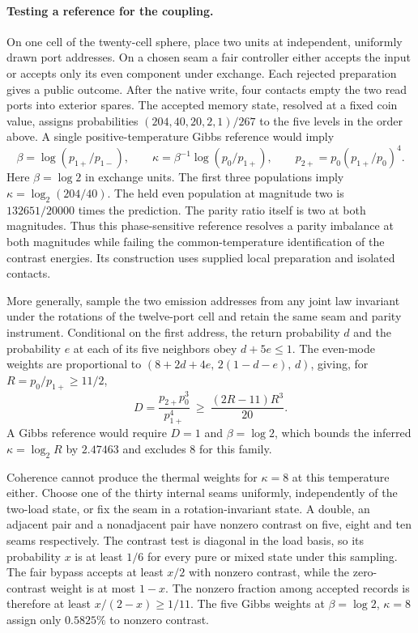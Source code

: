 \documentclass[11pt]{article}
\theoremstyle{definition}
\theoremstyle{remark}
\theoremstyle{plain}
\begin{document}
\paragraph{Testing a reference for the coupling.}
On one cell of the twenty-cell sphere, place two units at independent,
uniformly drawn port addresses. On a chosen seam a fair controller either
accepts the input or accepts only its even component under exchange.
Each rejected preparation gives a public outcome. After the native write,
four contacts empty the two read ports into exterior spares. The accepted
memory state, resolved at a fixed coin value, assigns probabilities
$(204,40,20,2,1)/267$ to the five levels in the order above. A single
positive-temperature Gibbs reference would imply
\[
  \beta=\log(p_{1+}/p_{1-}),\qquad
  \kappa=\beta^{-1}\log(p_0/p_{1+}),\qquad
  p_{2+}=p_0(p_{1+}/p_0)^4 .
\]
Here $\beta=\log 2$ in exchange units. The first three populations imply
$\kappa=\log_2(204/40)$. The held even population at magnitude two is
$132651/20000$ times the prediction. The parity ratio itself is two at
both magnitudes. Thus this phase-sensitive reference resolves a parity
imbalance at both magnitudes while failing the common-temperature
identification of the contrast energies. Its construction uses supplied
local preparation and isolated contacts.

More generally, sample the two emission addresses from any joint law invariant
under the rotations of the twelve-port cell and retain the same seam and parity
instrument. Conditional on the first address, the return probability $d$ and
the probability $e$ at each of its five neighbors obey $d+5e\leq1$.
The even-mode weights are proportional to
$(8+2d+4e,\,2(1-d-e),\,d)$, giving, for $R=p_0/p_{1+}\geq11/2$,
\[
 D=\frac{p_{2+}p_0^3}{p_{1+}^4}\ \geq\ \frac{(2R-11)R^3}{20}.
\]
A Gibbs reference would require $D=1$ and $\beta=\log 2$, which bounds
the inferred $\kappa=\log_2 R$ by $2.47463$ and excludes $8$ for this family.

Coherence cannot produce the thermal weights for $\kappa=8$ at this
temperature either. Choose one of the thirty internal seams uniformly,
independently of the two-load state, or fix the seam in a rotation-invariant
state. A double, an adjacent pair and a nonadjacent pair have nonzero
contrast on five, eight and ten seams respectively. The contrast test
is diagonal in the load basis, so its probability $x$ is at least $1/6$
for every pure or mixed state under this sampling. The fair bypass accepts
at least $x/2$ with nonzero contrast, while the zero-contrast weight is
at most $1-x$. The nonzero fraction among accepted records is therefore
at least $x/(2-x)\geq1/11$. The five Gibbs weights at
$\beta=\log 2$, $\kappa=8$ assign only $0.5825\%$ to nonzero contrast.
\end{document}

